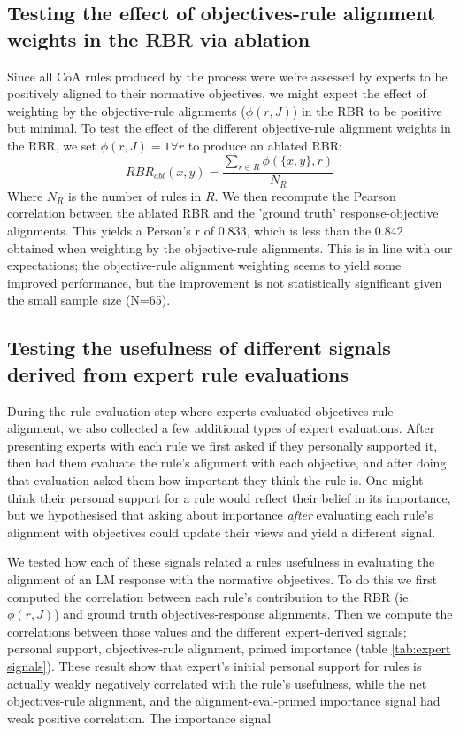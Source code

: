 \documentclass{article}
\begin{document}
\subsection{Testing the effect of objectives-rule alignment weights in the RBR via ablation}
Since all CoA rules produced by the process were we're assessed by experts to be positively aligned to their normative objectives, we might expect the effect of weighting by the objective-rule alignments ($\phi(r,J)$) in the RBR to be positive but minimal. To test the effect of the different objective-rule alignment weights in the RBR, we set $\phi(r,J) = 1 \forall r$ to produce an ablated RBR:
\begin{equation}
    RBR_{abl}(x,y) = \frac{\sum\limits_{r\in R} \phi(\{x,y\},r)}{N_R}
\end{equation}
Where $N_R$ is the number of rules in $R$. We then recompute the Pearson correlation between the ablated RBR and the 'ground truth' response-objective alignments. This yields a Person's r of 0.833, which is less than the 0.842 obtained when weighting by the objective-rule alignments. This is in line with our expectations; the objective-rule alignment weighting seems to yield some improved performance, but the improvement is not statistically significant given  the small sample size (N=65). 


\subsection{Testing the usefulness of different signals derived from expert rule evaluations}
During the rule evaluation step where experts evaluated objectives-rule alignment, we also collected a few additional types of expert evaluations. After presenting experts with each rule we first asked if they personally supported it, then had them evaluate the rule's alignment with each objective, and after doing that evaluation asked them how important they think the rule is. One might think their personal support for a rule would reflect their belief in its importance, but we hypothesised that asking about importance \emph{after} evaluating each rule's alignment with objectives could update their views and yield a different signal. 

We tested how each of these signals related a rules usefulness in evaluating the alignment of an LM response with the normative objectives. To do this we first computed the correlation between each rule's contribution to the RBR (ie. $\phi(r,J)$) and ground truth objectives-response alignments.  Then we compute the correlations between those values and the different expert-derived signals; personal support, objectives-rule alignment, primed importance (table \ref{tab:expert signals}). These result show that expert's initial personal support for rules is actually weakly negatively correlated with the rule's usefulness, while the net objectives-rule alignment, and the alignment-eval-primed importance signal had weak positive correlation. The importance signal 
\end{document}
